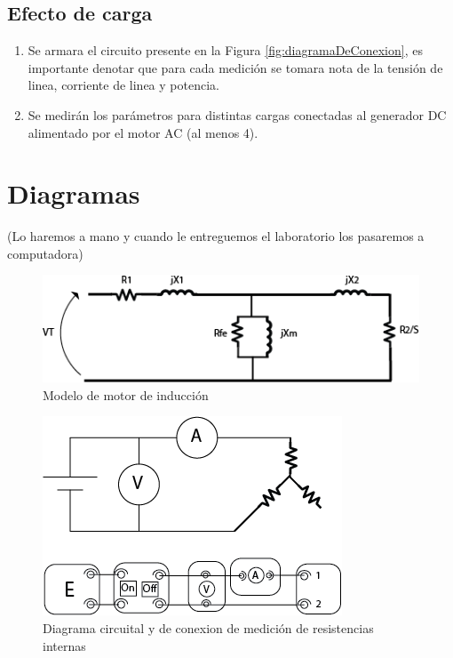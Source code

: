 \documentclass[11pt,letterpaper]{article}     %
\begin{document}
\subsection{Efecto de carga}
\begin{enumerate}
	\item Se armara el circuito presente en la Figura \ref{fig:diagramaDeConexion}, es importante denotar que para cada medición se tomara nota de la tensión  de linea, corriente de linea y potencia.
	\item Se medirán los parámetros para distintas cargas conectadas al generador DC alimentado por el motor AC (al menos 4).
\end{enumerate}
\section{Diagramas}
(Lo haremos a mano y cuando le entreguemos el laboratorio los pasaremos a computadora)
	\begin{figure}[H]
	\centering
	\includegraphics[scale=0.8]{./recursos-Lab8/modeloInternoMotorInduccion.png}
	\caption{Modelo de motor de inducción}
	\label{fig:modeloMotorInduccion}
\end{figure}

\begin{figure}[H]
	\centering
	\includegraphics[scale=0.8]{./recursos-Lab8/diagramaConexionMedicionResistencia.png}
	\caption{Diagrama circuital y de conexion de medición de resistencias internas}
	\label{fig:modeloConexionResistencias}
\end{figure}
\end{document}
